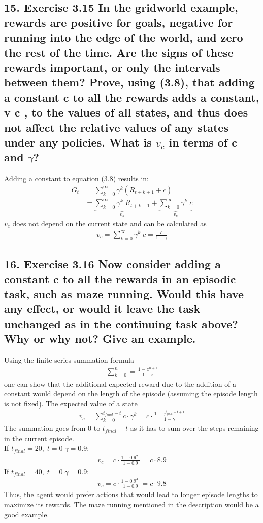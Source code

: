 \subsection*{15. Exercise 3.15 In the gridworld example, rewards are positive for goals, negative for running into the edge of the world, and zero the rest of the time. Are the signs of these rewards important, or only the intervals between them? Prove, using (3.8), that adding a constant c to all the rewards adds a constant, v c , to the values of all states, and thus does not affect the relative values of any states under any policies. What is $v_c$ in terms of c and $\gamma$?}
Adding a constant to equation (3.8) results in:
\begin{align*}
G_t &= \sum_{k=0}^\infty \gamma^k (R_{t+k+1} + c) \\
&= \underbrace{\sum_{k=0}^\infty \gamma^k\; R_{t+k+1}}_{v_\pi} + \underbrace{\sum_{k=0}^\infty \gamma^k\; c}_{v_c}
\end{align*}
$v_c$ does not depend on the current state and can be calculated as
\begin{align*}
v_c = \sum_{k=0}^\infty \gamma^k\; c = \frac{c	}{1 - \gamma}
\end{align*}


\subsection*{16. Exercise 3.16 Now consider adding a constant c to all the rewards in an episodic task, such as maze running. Would this have any effect, or would it leave the task unchanged as in the continuing task above? Why or why not? Give an example.}
Using the finite series summation formula
\begin{align*}
\sum_{k=0}^{n} = \frac{1-z^{n+1}}{1-z}
\end{align*}
one can show that the additional expected reward due to the addition of a constant would depend on the length of the episode (assuming the episode length is not fixed).
The expected value of a state
\begin{align*}
v_c=\sum_{k=0}^{t_{final}-t} c \cdot \gamma^k = c \cdot \frac{1 - \gamma^{t_{final}-t+1}}{1 - \gamma}
\end{align*}
The summation goes from $0$ to $t_{final}-t$ as it has to sum over the steps remaining in the current episode. \\
If $t_{final} = 20,\; t = 0\; \gamma=0.9$:
\begin{align*}
v_c= c \cdot \frac{1 - 0.9^{21}}{1- 0.9} = c \cdot 8.9
\end{align*}
If $t_{final} = 40,\; t=0\; \gamma=0.9$:
\begin{align*}
v_c= c \cdot \frac{1 - 0.9^{41}}{1- 0.9} = c \cdot 9.8
\end{align*}
Thus, the agent would prefer actions that would lead to longer episode lengths to maximize its rewards. The maze running mentioned in the description would be a good example. 

